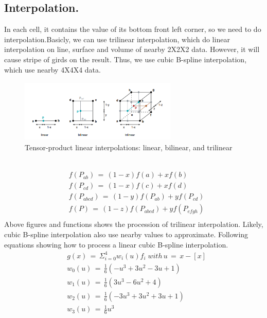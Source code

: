 \documentclass[acmtog]{acmart}
\begin{document}
	\subsection{Interpolation.}
	In each cell, it contains the value of its bottom front left corner, so we need to do interpolation.Basicly, we can use trilinear interpolation, which do linear interpolation on line, surface and volume of nearby 2X2X2 data. However, it will cause stripe of girds on the result. Thus, we use cubic B-spline interpolation, which use nearby 4X4X4 data.
	\begin{figure}[htbp]\centering 
		\centering
		\includegraphics[height=3cm,width=7.5cm]{1.png}
		\caption{Tensor-product linear interpolations: linear, bilinear, and trilinear}
	\end{figure}\\
	\begin{equation}
		\begin{split}
			&f(P_{ab})\,=\,(1-x)f(a)+xf(b) \\
			&f(P_{cd})\,=\,(1-x)f(c)+xf(d) \\
			&f(P_{abcd})\,=\,(1-y)f(P_{ab})+yf(P_{cd}) \\
			&f(P)\,=\,(1-z)f(P_{abcd})+yf(P_{efgh}) \\
		\end{split}		
	\end{equation}
	Above figures and functions shows the procession of trilinear interpolation. Likely, cubic B-spline interpolation also use nearby values to approximate. Following equations
	showing how to process a linear cubic B-spline interpolation.
	\begin{equation}
		\begin{split}
			&g(x)\,=\, \Sigma_{i=0}^{4} w_i(u)f_i \; with\,u\,=\,x-[x]\\
			&w_0(u)\,=\,\frac{1}{6}(-u^3+3u^2-3u+1) \\
			&w_1(u)\,=\,\frac{1}{6}(3u^3-6u^2+4) \\
			&w_2(u)\,=\,\frac{1}{6}(-3u^3+3u^2+3u+1) \\
			&w_3(u)\,=\,\frac{1}{6}u^3 \\
		\end{split}		
	\end{equation}
\end{document}
